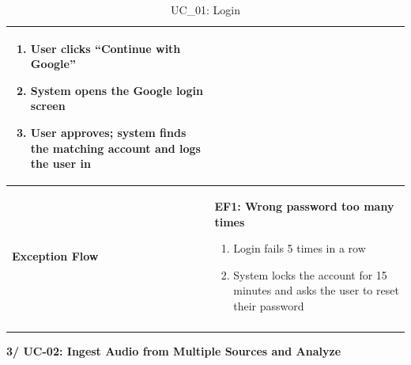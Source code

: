 \documentclass[a4paper]{article}
\newlength{\ucLeft}
\begin{document}
\begin{longtable}{|>{\bfseries}p{\ucLeft}|p{\dimexpr\linewidth-\ucLeft-2\tabcolsep-2\arrayrulewidth}|}
\begin{enumerate}[leftmargin=1.5em, nosep, topsep=2pt, partopsep=0pt, parsep=0pt, after=\strut]
    \item User clicks ``Continue with Google''
    \item System opens the Google login screen
    \item User approves; system finds the matching account and logs the user in
\end{enumerate}
\\ \hline
Exception Flow &
\textbf{EF1: Wrong password too many times}
\begin{enumerate}[leftmargin=1.5em, nosep, topsep=2pt, partopsep=0pt, parsep=0pt, after=\strut]
    \item Login fails 5 times in a row
    \item System locks the account for 15 minutes and asks the user to reset their password
\end{enumerate}
\\ \hline
\caption{UC\_01: Login}\label{tab:uc01_login}
\end{longtable}

\vspace{0.5em}
\noindent\textbf{3/ UC-02: Ingest Audio from Multiple Sources and Analyze}
\end{document}
